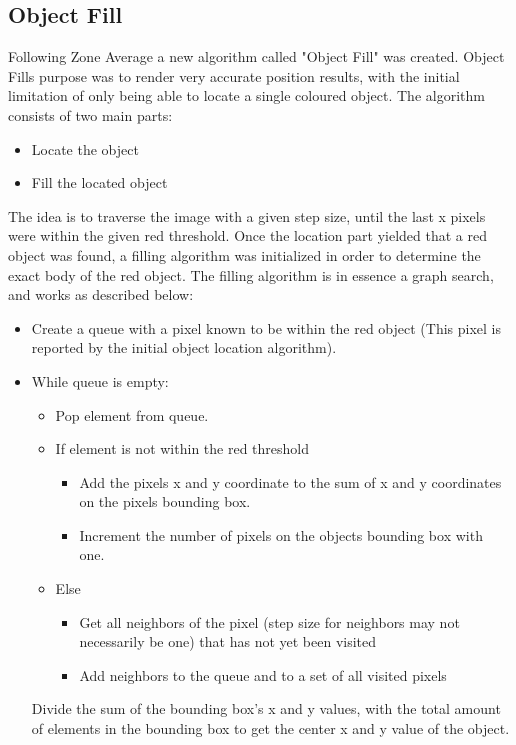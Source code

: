 \subsection{Object Fill}
Following Zone Average a new algorithm called "Object Fill" was created.
Object Fills purpose was to render very accurate position results, with the initial limitation of only being able to locate a single coloured object.
The algorithm consists of two main parts:
\begin{itemize}
	\item Locate the object
	\item Fill the located object
\end{itemize}
The idea is to traverse the image with a given step size, until the last x pixels were within the given red threshold.
Once the location part yielded that a red object was found, a filling algorithm was initialized in order to determine the exact body of the red object.
The filling algorithm is in essence a graph search, and works as described below:
\begin{itemize}
	\item Create a queue with a pixel known to be within the red object (This pixel is reported by the initial object location algorithm).
	\item While queue is empty:
	\begin{itemize}
		\item Pop element from queue.
		\item If element is not within the red threshold
		\begin{itemize}
			\item Add the pixels x and y coordinate to the sum of x and y coordinates on the pixels bounding box.
			\item Increment the number of pixels on the objects bounding box with one.
		\end{itemize}
		\item Else
		\begin{itemize}
			\item Get all neighbors of the pixel (step size for neighbors may not necessarily be one) that has not yet been visited
			\item Add neighbors to the queue and to a set of all visited pixels
		\end{itemize}
	\end{itemize}
	Divide the sum of the bounding box's x and y values, with the total amount of elements in the bounding box to get the center x and y value of the object.
\end{itemize}

